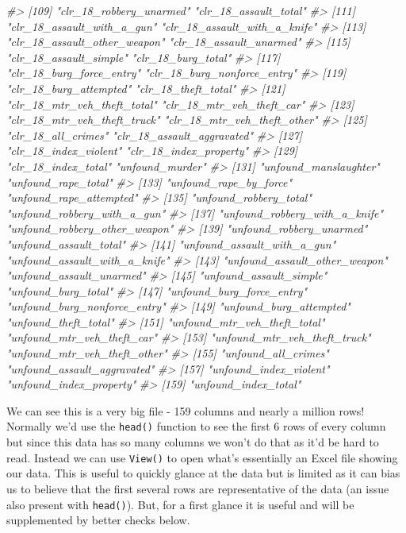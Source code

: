 \documentclass[
  12pt,
]{book}
\newenvironment{Shaded}{\begin{snugshade}}{\end{snugshade}}
\newcommand{\CommentTok}[1]{\textcolor[rgb]{0.37,0.37,0.37}{\textit{#1}}}
\begin{document}
\begin{Shaded}
\begin{Highlighting}[]
\CommentTok{\#> [109] "clr\_18\_robbery\_unarmed"         "clr\_18\_assault\_total"          }
\CommentTok{\#> [111] "clr\_18\_assault\_with\_a\_gun"      "clr\_18\_assault\_with\_a\_knife"   }
\CommentTok{\#> [113] "clr\_18\_assault\_other\_weapon"    "clr\_18\_assault\_unarmed"        }
\CommentTok{\#> [115] "clr\_18\_assault\_simple"          "clr\_18\_burg\_total"             }
\CommentTok{\#> [117] "clr\_18\_burg\_force\_entry"        "clr\_18\_burg\_nonforce\_entry"    }
\CommentTok{\#> [119] "clr\_18\_burg\_attempted"          "clr\_18\_theft\_total"            }
\CommentTok{\#> [121] "clr\_18\_mtr\_veh\_theft\_total"     "clr\_18\_mtr\_veh\_theft\_car"      }
\CommentTok{\#> [123] "clr\_18\_mtr\_veh\_theft\_truck"     "clr\_18\_mtr\_veh\_theft\_other"    }
\CommentTok{\#> [125] "clr\_18\_all\_crimes"              "clr\_18\_assault\_aggravated"     }
\CommentTok{\#> [127] "clr\_18\_index\_violent"           "clr\_18\_index\_property"         }
\CommentTok{\#> [129] "clr\_18\_index\_total"             "unfound\_murder"                }
\CommentTok{\#> [131] "unfound\_manslaughter"           "unfound\_rape\_total"            }
\CommentTok{\#> [133] "unfound\_rape\_by\_force"          "unfound\_rape\_attempted"        }
\CommentTok{\#> [135] "unfound\_robbery\_total"          "unfound\_robbery\_with\_a\_gun"    }
\CommentTok{\#> [137] "unfound\_robbery\_with\_a\_knife"   "unfound\_robbery\_other\_weapon"  }
\CommentTok{\#> [139] "unfound\_robbery\_unarmed"        "unfound\_assault\_total"         }
\CommentTok{\#> [141] "unfound\_assault\_with\_a\_gun"     "unfound\_assault\_with\_a\_knife"  }
\CommentTok{\#> [143] "unfound\_assault\_other\_weapon"   "unfound\_assault\_unarmed"       }
\CommentTok{\#> [145] "unfound\_assault\_simple"         "unfound\_burg\_total"            }
\CommentTok{\#> [147] "unfound\_burg\_force\_entry"       "unfound\_burg\_nonforce\_entry"   }
\CommentTok{\#> [149] "unfound\_burg\_attempted"         "unfound\_theft\_total"           }
\CommentTok{\#> [151] "unfound\_mtr\_veh\_theft\_total"    "unfound\_mtr\_veh\_theft\_car"     }
\CommentTok{\#> [153] "unfound\_mtr\_veh\_theft\_truck"    "unfound\_mtr\_veh\_theft\_other"   }
\CommentTok{\#> [155] "unfound\_all\_crimes"             "unfound\_assault\_aggravated"    }
\CommentTok{\#> [157] "unfound\_index\_violent"          "unfound\_index\_property"        }
\CommentTok{\#> [159] "unfound\_index\_total"}
\end{Highlighting}
\end{Shaded}

We can see this is a very big file - 159 columns and nearly a million rows! Normally we'd use the \texttt{head()} function to see the first 6 rows of every column but since this data has so many columns we won't do that as it'd be hard to read. Instead we can use \texttt{View()} to open what's essentially an Excel file showing our data. This is useful to quickly glance at the data but is limited as it can bias us to believe that the first several rows are representative of the data (an issue also present with \texttt{head()}). But, for a first glance it is useful and will be supplemented by better checks below.
\end{document}
